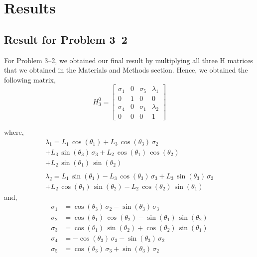 \documentclass[conference]{IEEEtran}
\begin{document}
\section{Results}

\subsection{Result for Problem 3--2}

For Problem 3--2, we obtained our final result by multiplying all three H matrices
that we obtained in the Materials and Methods section. Hence, we obtained the following
matrix,
\[
    H^0_3 =
    \begin{bmatrix}
    \sigma_1  & 0 & \sigma_5  & \lambda_1 \\
    0 & 1 & 0 & 0\\
    \sigma_4 & 0 & \sigma_1  & \lambda_2 \\
    0 & 0 & 0 & 1
    \end{bmatrix}
\]

where,
\begin{multline*}
    \lambda_1 = L_1 \,\cos \left(\theta_1 \right)+L_3 \,\cos \left(\theta_3 \right)\,\sigma_2 \\+L_3 \,\sin \left(\theta_3 \right)\,\sigma_3 +L_2 \,\cos \left(\theta_1 \right)\,\cos \left(\theta_2 \right)\\+L_2 \,\sin \left(\theta_1 \right)\,\sin \left(\theta_2 \right)\\
    \\
    \lambda_2 = L_1 \,\sin \left(\theta_1 \right)-L_3 \,\cos \left(\theta_3 \right)\,\sigma_3 +L_3 \,\sin \left(\theta_3 \right)\,\sigma_2 \\+L_2 \,\cos \left(\theta_1 \right)\,\sin \left(\theta_2 \right)-L_2 \,\cos \left(\theta_2 \right)\,\sin \left(\theta_1 \right)
\end{multline*}
\hspace{10pt} and,
\begin{align*}
    \sigma_1 &=\cos \left(\theta_3 \right)\,\sigma_2 -\sin \left(\theta_3 \right)\,\sigma_3 \\
    \sigma_2 &=\cos \left(\theta_1 \right)\,\cos \left(\theta_2 \right)-\sin \left(\theta_1 \right)\,\sin \left(\theta_2 \right)\\
    \sigma_3 &=\cos \left(\theta_1 \right)\,\sin \left(\theta_2 \right)+\cos \left(\theta_2 \right)\,\sin \left(\theta_1 \right)\\
    \sigma_4 &= -\cos \left(\theta_3 \right)\,\sigma_3 -\sin \left(\theta_3 \right)\,\sigma_2\\
    \sigma_5 &= \cos \left(\theta_3 \right)\,\sigma_3 +\sin \left(\theta_3 \right)\,\sigma_2
\end{align*}
\end{document}
